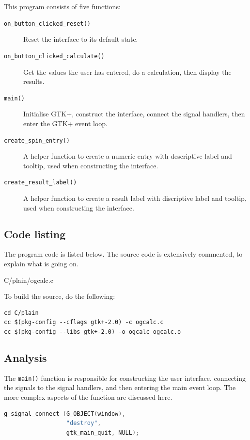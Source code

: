 \documentclass[a4paper,oneside]{article}
\newcommand{\filename}[1]{\texttt{#1}}
\newcommand{\function}[1]{\texttt{#1()}}
\begin{document}
This program consists of five functions:

\begin{description}
\item[\function{on\_button\_clicked\_reset}] Reset the interface to its default state.
\item[\function{on\_button\_clicked\_calculate}] Get the values the user has entered, do
  a calculation, then display the results.
\item[\function{main}] Initialise GTK+, construct the interface,
  connect the signal handlers, then enter the GTK+ event loop.
\item[\function{create\_spin\_entry}] A helper function to create a
  numeric entry with descriptive label and tooltip, used when
  constructing the interface.
\item[\function{create\_result\_label}] A helper function to create a
  result label with discriptive label and tooltip, used when
  constructing the interface.
\end{description}

\subsection{Code listing}

The program code is listed below.  The source code is extensively
commented, to explain what is going on.



                 {C/plain/ogcalc.c}

To build the source, do the following:

\begin{verbatim}
cd C/plain
cc $(pkg-config --cflags gtk+-2.0) -c ogcalc.c
cc $(pkg-config --libs gtk+-2.0) -o ogcalc ogcalc.o
\end{verbatim}

\subsection{Analysis}

The \function{main} function is responsible for constructing the user
interface, connecting the signals to the signal handlers, and then
entering the main event loop.  The more complex aspects of the
function are discussed here.

\begin{lstlisting}[numbers=none, language=C]
g_signal_connect (G_OBJECT(window),
                  "destroy",
                  gtk_main_quit, NULL);
\end{lstlisting}
\end{document}

